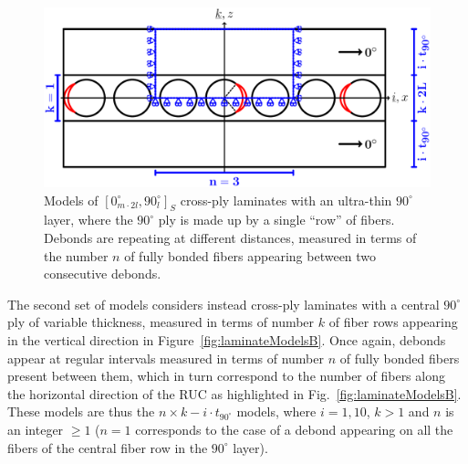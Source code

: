 \documentclass[review]{elsarticle}
\begin{document}
\begin{figure}[!h]
\centering
  \includegraphics[width=\textwidth]{thinPly.pdf}
\caption{Models of $\left[0_{m\cdot2l}^{\circ},90_{l}^{\circ}\right]_{S}$ cross-ply laminates with an ultra-thin $90^{\circ}$ layer, where the $90^{\circ}$ ply is made up by a single ``row'' of fibers. Debonds are repeating at different distances, measured in terms of the number $n$ of fully bonded fibers appearing between two consecutive debonds.}\label{fig:laminateModelsA}
\end{figure}

The second set of models considers instead cross-ply laminates with a central $90^{\circ}$ ply of variable thickness, measured in terms of number $k$ of fiber rows appearing in the vertical direction in Figure~\ref{fig:laminateModelsB}. Once again, debonds appear at regular intervals measured in terms of number $n$ of fully bonded fibers present between them, which in turn correspond to the number of fibers along the horizontal direction of the RUC as highlighted in Fig.~\ref{fig:laminateModelsB}. These models are thus the $n\times k-i\cdot t_{90^{\circ}}$ models, where $i=1,10$, $k>1$ and $n$ is an integer $\geq1$ ($n=1$ corresponds to the case of a debond appearing on all the fibers of the central fiber row in the $90^{\circ}$ layer).
\end{document}
